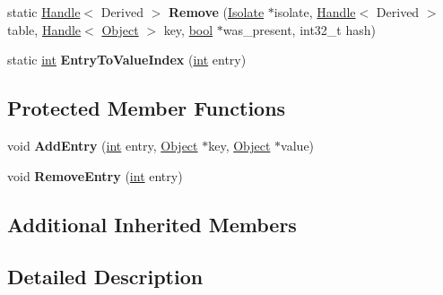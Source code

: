 \begin{DoxyCompactItemize}
\item 
\mbox{\label{classv8_1_1internal_1_1ObjectHashTableBase_a1e6e4fa96bb6d6ea68b3f9bef70a2696}} 
static \mbox{\hyperlink{classv8_1_1internal_1_1Handle}{Handle}}$<$ Derived $>$ {\bfseries Remove} (\mbox{\hyperlink{classv8_1_1internal_1_1Isolate}{Isolate}} $\ast$isolate, \mbox{\hyperlink{classv8_1_1internal_1_1Handle}{Handle}}$<$ Derived $>$ table, \mbox{\hyperlink{classv8_1_1internal_1_1Handle}{Handle}}$<$ \mbox{\hyperlink{classv8_1_1internal_1_1Object}{Object}} $>$ key, \mbox{\hyperlink{classbool}{bool}} $\ast$was\+\_\+present, int32\+\_\+t hash)
\item 
\mbox{\label{classv8_1_1internal_1_1ObjectHashTableBase_a2d316ad9a341caaa8a5c25c333dfa0d0}} 
static \mbox{\hyperlink{classint}{int}} {\bfseries Entry\+To\+Value\+Index} (\mbox{\hyperlink{classint}{int}} entry)
\end{DoxyCompactItemize}
\subsection*{Protected Member Functions}
\begin{DoxyCompactItemize}
\item 
\mbox{\label{classv8_1_1internal_1_1ObjectHashTableBase_a389cb7ac05642ee33135f00aa8213a63}} 
void {\bfseries Add\+Entry} (\mbox{\hyperlink{classint}{int}} entry, \mbox{\hyperlink{classv8_1_1internal_1_1Object}{Object}} $\ast$key, \mbox{\hyperlink{classv8_1_1internal_1_1Object}{Object}} $\ast$value)
\item 
\mbox{\label{classv8_1_1internal_1_1ObjectHashTableBase_ab9bb9cb4b394cfcbc89c93db0aaf7ef4}} 
void {\bfseries Remove\+Entry} (\mbox{\hyperlink{classint}{int}} entry)
\end{DoxyCompactItemize}
\subsection*{Additional Inherited Members}


\subsection{Detailed Description}
